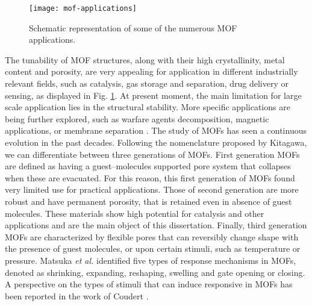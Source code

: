 %
%
\begin{figure}[htbp]
	\centering
 	\texttt{[image: mof-applications]}
	\caption{Schematic representation of some of the numerous MOF applications.}
	\label{fig:mof-applications}
\end{figure}
%
%
\npar
The tunability of MOF structures, along with their high crystallinity, metal content and porosity, are very appealing for application in different industrially relevant fields, such as catalysis, gas storage and separation, drug delivery or sensing, as displayed in Fig. \ref{fig:mof-applications}. At present moment, the main limitation for large scale application lies in the structural stability. More specific applications are being further explored, such as warfare agents decomposition, magnetic applications, or membrane separation \cite{furukawa2013chemistry}.
\npar
The study of MOFs has seen a continuous evolution in the past decades.
Following the nomenclature proposed by Kitagawa, we can differentiate between three generations of MOFs\cite{kitagawa1998functional}. First generation MOFs are defined as having a guest--molecules supported pore system that collapses when these are evacuated. For this reason, this first generation of MOFs found very limited use for practical applications. Those of second generation are more robust and have permanent porosity, that is retained even in absence of guest molecules. These materials show high potential for catalysis and other applications and are the main object of this dissertation. Finally, third generation MOFs are characterized by flexible pores that can reversibly change shape with the presence of guest molecules, or upon certain stimuli, such as temperature or pressure. Matsuka \textit{et al.}\cite{matsuda2004guest} identified five types of response mechanisms in MOFs, denoted as shrinking, expanding, reshaping, swelling and gate opening or closing. A perspective on the types of stimuli that can induce responsive in MOFs has been reported in the work of Coudert \cite{coudert2015responsive}.


